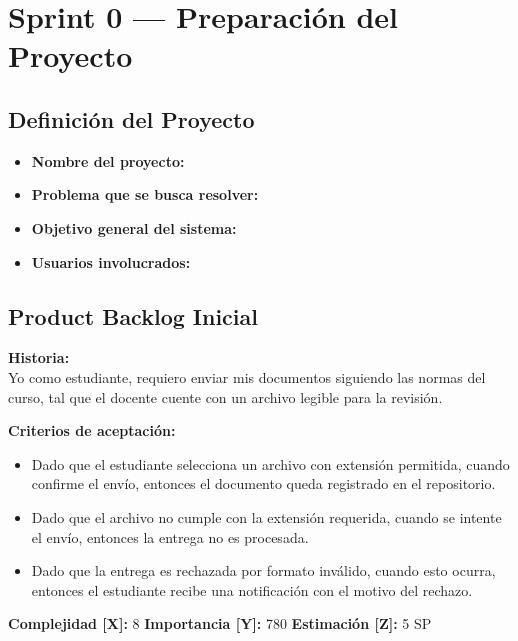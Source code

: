 \documentclass[12pt,a4paper]{article}
\begin{document}
\newpage

\section{Sprint 0 — Preparación del Proyecto}

\subsection{Definición del Proyecto}


\begin{itemize}
    \item \textbf{Nombre del proyecto:} %
    \item \textbf{Problema que se busca resolver:} %
    \item \textbf{Objetivo general del sistema:} %
    \item \textbf{Usuarios involucrados:} %
\end{itemize}

\subsection{Product Backlog Inicial}


\begin{tcolorbox}[title=\textbf{HU-01: Entregar trabajos de forma estandarizada}]
\textbf{Historia:} \\
Yo como estudiante, requiero enviar mis documentos siguiendo las normas del curso, tal que el docente cuente con un archivo legible para la revisión.

\vspace{0.5em}
\textbf{Criterios de aceptación:}
\begin{itemize}
    \item Dado que el estudiante selecciona un archivo con extensión permitida, cuando confirme el envío, entonces el documento queda registrado en el repositorio.
    \item Dado que el archivo no cumple con la extensión requerida, cuando se intente el envío, entonces la entrega no es procesada.
    \item Dado que la entrega es rechazada por formato inválido, cuando esto ocurra, entonces el estudiante recibe una notificación con el motivo del rechazo.
\end{itemize}
\textbf{Complejidad [X]:} 8 \hfill \textbf{Importancia [Y]:} 780 \hfill \textbf{Estimación [Z]:} 5 SP
\end{tcolorbox}
\end{document}
